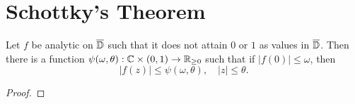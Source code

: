 \section{Schottky's Theorem}
\label{sec:schottkys-theorem}

\begin{theorem}[Schottky] \label{thm:schottky}
    Let $f$ be analytic on $\overline{\mathbb{D}}$ such that it does not attain $0$ or $1$ as values in $\overline{\mathbb{D}}$. Then there is a function $\psi(\omega, \theta) : \mathbb{C} \times (0, 1) \to \mathbb{R}_{\geq 0}$ such that if $\vert f(0) \vert \leq \omega$, then
    \begin{equation}
        \vert f(z) \vert \leq \psi(\omega, \theta), \quad \vert z \vert \leq \theta.
    \end{equation}
\end{theorem}

\begin{proof}
\end{proof}